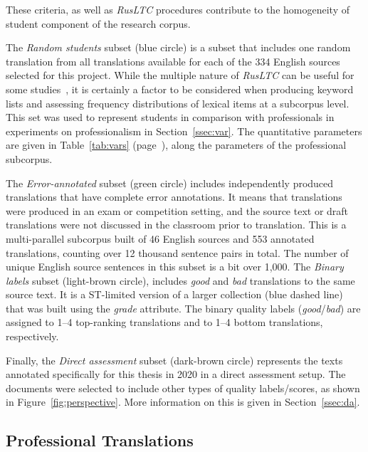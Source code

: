 These criteria, as well as \textit{RusLTC} procedures contribute to the homogeneity of student component of the research corpus. 

The \textit{Random students} subset (blue circle) is a subset that includes one random translation from all translations available for each of the 334 English sources selected for this project. While the multiple nature of \textit{RusLTC} can be useful for some studies~\cite[see][]{Castagnoli2009}, it is certainly a factor to be considered when producing keyword lists and assessing frequency distributions of lexical items at a subcorpus level. This set was used to represent students in comparison with professionals in experiments on professionalism in Section~\ref{ssec:var}. The quantitative parameters are given in Table~\ref{tab:vars} (page~\pageref{tab:vars}), along the parameters of the professional subcorpus.

The \textit{Error-annotated} subset (green circle) includes independently produced translations that have complete error annotations. It means that translations were produced in an exam or competition setting, and the source text or draft translations were not discussed in the classroom prior to translation. This is a multi-parallel subcorpus built of 46 English sources and 553 annotated translations, counting over 12 thousand sentence pairs in total. The number of unique English source sentences in this subset is a bit over 1,000.
\label{pg:binary}
The \textit{Binary labels} subset (light-brown circle), includes \textit{good} and \textit{bad} translations to the same source text. It is a ST-limited version of a larger collection (blue dashed line) that was built using the \textit{grade} attribute. The binary quality labels (\textit{good}/\textit{bad}) are assigned to 1--4 top-ranking translations and to 1--4 bottom translations, respectively.

Finally, the \textit{Direct assessment} subset (dark-brown circle) represents the texts annotated specifically for this thesis in 2020 in a direct assessment setup.  The documents were selected to include other types of quality labels/scores, as shown in Figure~\ref{fig:perspective}. More information on this is given in Section~\ref{ssec:da}.

\subsection{\label{ssec:mypro}Professional Translations}

